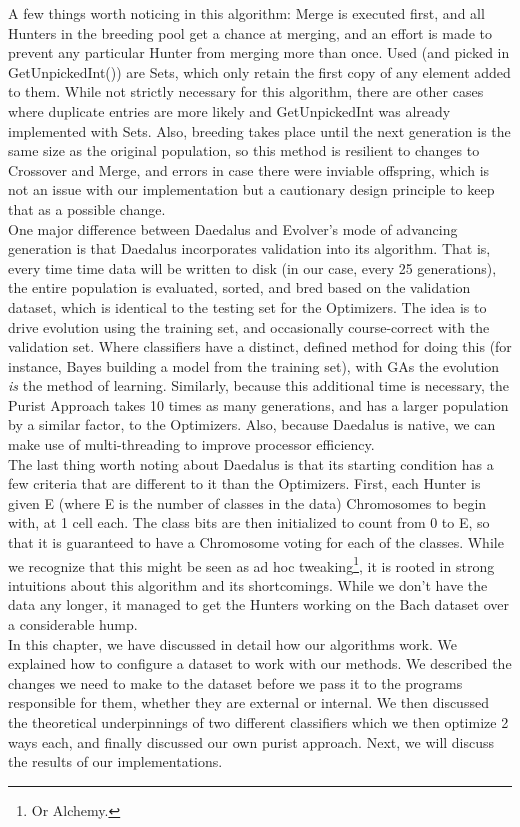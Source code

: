 A few things worth noticing in this algorithm: Merge is executed first, and all Hunters in the breeding pool get a chance at merging, and an effort is made to prevent any particular Hunter from merging more than once.  Used (and picked in GetUnpickedInt()) are Sets, which only retain the first copy of any element added to them.  While not strictly necessary for this algorithm, there are other cases where duplicate entries are more likely and GetUnpickedInt was already implemented with Sets.
Also, breeding takes place until the next generation is the same size as the original population, so this method is resilient to changes to Crossover and Merge, and errors in case there were inviable offspring, which is not an issue with our implementation but a cautionary design principle to keep that as a possible change.\\
One major difference between Daedalus and Evolver's mode of advancing generation is that Daedalus incorporates validation into its algorithm.  That is, every time time data will be written to disk (in our case, every 25 generations), the entire population is evaluated, sorted, and bred based on the validation dataset, which is identical to the testing set for the Optimizers.  The idea is to drive evolution using the training set, and occasionally course-correct with the validation set.  Where classifiers have a distinct, defined method for doing this (for instance, Bayes building a model from the training set), with GAs the evolution \textit{is} the method of learning.  Similarly, because this additional time is necessary, the Purist Approach takes 10 times as many generations, and has a larger population by a similar factor, to the Optimizers.  
Also, because Daedalus is native, we can make use of multi-threading to improve processor efficiency.\\
The last thing worth noting about Daedalus is that its starting condition has a few criteria that are different to it than the Optimizers.  First, each Hunter is given E (where E is the number of classes in the data) Chromosomes to begin with, at 1 cell each.  The class bits are then initialized to count from 0 to E, so that it is guaranteed to have a Chromosome voting for each of the classes.  While we recognize that this might be seen as ad hoc tweaking\footnote{Or Alchemy.}, it is rooted in strong intuitions about this algorithm and its shortcomings.  While we don't have the data any longer, it managed to get the Hunters working on the Bach dataset over a considerable hump.\\
In this chapter, we have discussed in detail how our algorithms work. We explained how to configure a dataset to work with our methods.  We described the changes we need to make to the dataset before we pass it to the programs responsible for them, whether they are external or internal.  We then discussed the theoretical underpinnings of two different classifiers which we then optimize 2 ways each, and finally discussed our own purist approach.  Next, we will discuss the results of our implementations.